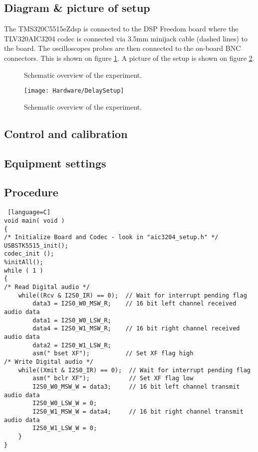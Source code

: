 \subsection{Diagram \& picture of setup}

The TMS320C5515eZdsp is connected to the DSP Freedom board where the TLV320AIC3204 codec is connected via 3.5mm minijack cable (dashed lines) to the board. The oscilloscopes probes are then connected to the on-board BNC connectors. This is shown on figure \ref{fig:SchematicDelayExperiment}. A picture of the setup is shown on figure \ref{fig:DelayExperimentSetup}.

\begin{figure}[H]
	\centering
	
	\caption{Schematic overview of the experiment.}
	\label{fig:SchematicDelayExperiment}
\end{figure}



\begin{figure}[H]
	\centering
\texttt{[image: Hardware/DelaySetup]}
	\caption{Schematic overview of the experiment.}
	\label{fig:DelayExperimentSetup}
\end{figure}


\subsection{Control and calibration}

\subsection{Equipment settings}



\subsection{Procedure}

\begin{lstlisting} [language=C]
void main( void )
{
/* Initialize Board and Codec - look in "aic3204_setup.h" */
USBSTK5515_init();
codec_init ();
%initAll();
while ( 1 )
{
/* Read Digital audio */
	while((Rcv & I2S0_IR) == 0);  // Wait for interrupt pending flag
		data3 = I2S0_W0_MSW_R;    // 16 bit left channel received audio data
		data1 = I2S0_W0_LSW_R;
		data4 = I2S0_W1_MSW_R;    // 16 bit right channel received audio data
		data2 = I2S0_W1_LSW_R;
		asm(" bset XF");	  	  // Set XF flag high
/* Write Digital audio */
	while((Xmit & I2S0_IR) == 0);  // Wait for interrupt pending flag
		asm(" bclr XF");		   // Set XF flag low
		I2S0_W0_MSW_W = data3;     // 16 bit left channel transmit audio data
		I2S0_W0_LSW_W = 0;
		I2S0_W1_MSW_W = data4;     // 16 bit right channel transmit audio data
		I2S0_W1_LSW_W = 0;
	}
}
\end{lstlisting}



